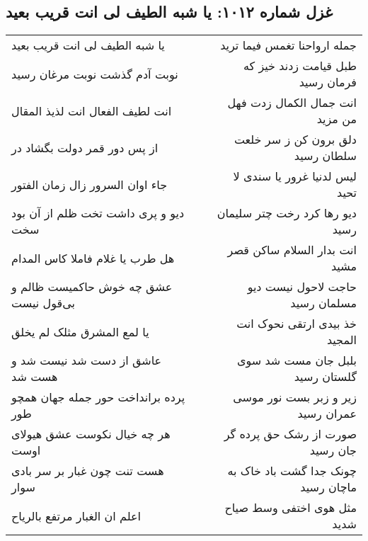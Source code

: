 \begin{center}
\section*{غزل شماره ۱۰۱۲: یا شبه الطیف لی انت قریب بعید}
\label{sec:1012}
\begin{longtable}{l p{0.5cm} r}
یا شبه الطیف لی انت قریب بعید
&&
جمله ارواحنا تغمس فیما ترید
\\
نوبت آدم گذشت نوبت مرغان رسید
&&
طبل قیامت زدند خیز که فرمان رسید
\\
انت لطیف الفعال انت لذیذ المقال
&&
انت جمال الکمال زدت فهل من مزید
\\
از پس دور قمر دولت بگشاد در
&&
دلق برون کن ز سر خلعت سلطان رسید
\\
جاء اوان السرور زال زمان الفتور
&&
لیس لدنیا غرور یا سندی لا تحید
\\
دیو و پری داشت تخت ظلم از آن بود سخت
&&
دیو رها کرد رخت چتر سلیمان رسید
\\
هل طرب یا غلام فاملا کاس المدام
&&
انت بدار السلام ساکن قصر مشید
\\
عشق چه خوش حاکمیست ظالم و بی‌قول نیست
&&
حاجت لاحول نیست دیو مسلمان رسید
\\
یا لمع المشرق مثلک لم یخلق
&&
خذ بیدی ارتقی نحوک انت المجید
\\
عاشق از دست شد نیست شد و هست شد
&&
بلبل جان مست شد سوی گلستان رسید
\\
پرده برانداخت حور جمله جهان همچو طور
&&
زیر و زبر بست نور موسی عمران رسید
\\
هر چه خیال نکوست عشق هیولای اوست
&&
صورت از رشک حق پرده گر جان رسید
\\
هست تنت چون غبار بر سر بادی سوار
&&
چونک جدا گشت باد خاک به ماچان رسید
\\
اعلم ان الغبار مرتفع بالریاح
&&
مثل هوی اختفی وسط صیاح شدید
\\
\end{longtable}
\end{center}
